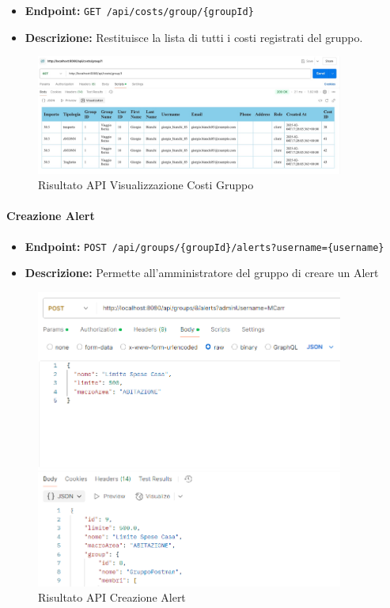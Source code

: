 \begin{itemize}
    \item \textbf{Endpoint:} \texttt{GET /api/costs/group/\{groupId\}}
    \item \textbf{Descrizione:} Restituisce la lista di tutti i costi registrati del gruppo.
\end{itemize}

\begin{figure}[H]
    \centering
    \includegraphics[width=0.9\textwidth]{images/getGroupCosts.jpeg}
    \caption{Risultato API Visualizzazione Costi Gruppo}
    \label{fig:api_view_group_costs}
\end{figure}


\paragraph{Creazione Alert} 

\begin{itemize}
    \item \textbf{Endpoint:} \texttt{POST /api/groups/\{groupId\}/alerts?username=\{username\}}
    \item \textbf{Descrizione:} Permette all'amministratore del gruppo di creare un Alert
\end{itemize}

\begin{figure}[H]
    \centering
    \includegraphics[width=0.9\textwidth]{images/createAlert.png}
    \caption{Risultato API Creazione Alert}
    \label{fig:api_createAlert}
\end{figure}

